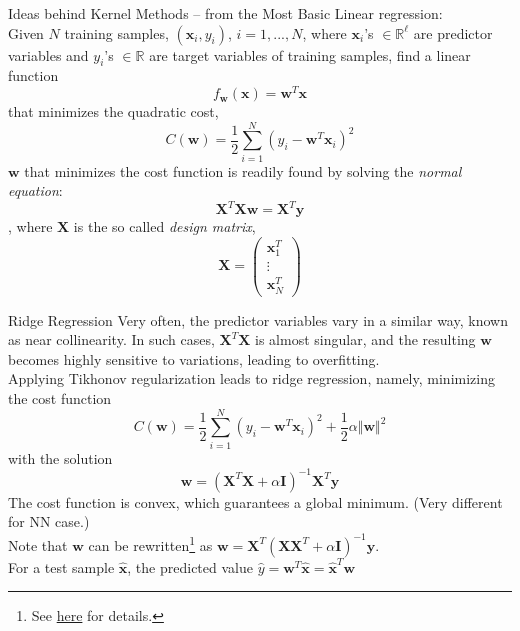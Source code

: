 \documentclass[aspectratio=169]{beamer}
\begin{document}
\begin{frame}{Ideas behind Kernel Methods -- from the Most Basic}
\scriptsize
Linear regression:\\
Given $N$ training samples, $(\mathbf{x}_i,y_i)$, $i=1,...,N$, where $\mathbf{x}_i$'s $\in\mathbb{R}^\ell$ are predictor variables and $y_i$'s $\in\mathbb{R}$ are target variables of training samples, find a linear function
\begin{equation}
  f_\mathbf{w}(\mathbf{x})=\mathbf{w}^T\mathbf{x}
\end{equation}
that minimizes the quadratic cost,
\begin{equation}
  C(\mathbf{w})=\frac{1}{2}\sum_{i=1}^{N}(y_i-\mathbf{w}^T\mathbf{x}_i)^2
\end{equation}
$\mathbf{w}$ that minimizes the cost function is readily found by solving the \emph{normal equation}:
\begin{equation}
  \mathbf{X}^T\mathbf{X}\mathbf{w}=\mathbf{X}^T\mathbf{y}
\end{equation}
, where $\mathbf{X}$ is the so called \emph{design matrix}, 
\begin{equation}
  \mathbf{X}=\begin{pmatrix}\mathbf{x}_1^T \\ \vdots \\ \mathbf{x}_N^T \end{pmatrix}
\end{equation}
\end{frame}

\begin{frame}{Ridge Regression}
\scriptsize
Very often, the predictor variables vary in a similar way, known as near collinearity. In such cases, $\mathbf{X}^T\mathbf{X}$ is almost singular, and the resulting $\mathbf{w}$ becomes highly sensitive to variations, leading to overfitting.\\
Applying Tikhonov regularization leads to ridge regression, namely, minimizing the cost function
\begin{equation}
  C(\mathbf{w})=\frac{1}{2}\sum_{i=1}^{N}(y_i-\mathbf{w}^T\mathbf{x}_i)^2+\frac{1}{2}\alpha\Vert\mathbf{w}\Vert^2
\end{equation}
with the solution
\begin{equation}
  \mathbf{w}=(\mathbf{X}^T\mathbf{X}+\alpha\mathbf{I})^{-1}\mathbf{X}^T\mathbf{y}
\end{equation}
The cost function is convex, which guarantees a global minimum. (Very different for NN case.)\\
Note that $\mathbf{w}$ can be rewritten\footnote{See \href{http://stat.wikia.com/wiki/Kernel_Ridge_Regression}{here} for details.} as $\mathbf{w}=\mathbf{X}^T(\mathbf{X}\mathbf{X}^T+\alpha\mathbf{I})^{-1}\mathbf{y}$.\\
For a test sample $\hat{\mathbf{x}}$, the predicted value $\hat{y}=\mathbf{w}^T\hat{\mathbf{x}}=\hat{\mathbf{x}}^T\mathbf{w}$
\end{frame}
\end{document}
